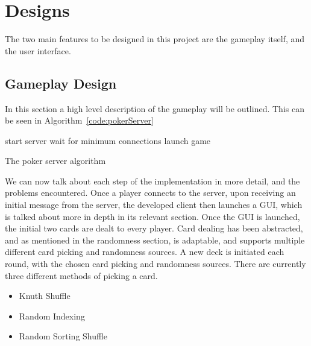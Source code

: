 \section{Designs}
The two main features to be designed in this project are the gameplay itself,
and the user interface.

\subsection{Gameplay Design}
In this section a high level description of the gameplay will be outlined.
This can be seen in Algorithm~\ref{code:pokerServer}

\vspace{0.3cm}

\begin{algorithm}[H]
     start server\;
     wait for minimum connections\;
     launch game\;
\caption{The poker server algorithm}%
\label{code:pokerServer}
\end{algorithm}

\vspace{0.3cm}

We can now talk about each step of the implementation in more detail, and the
problems encountered. Once a player connects to the server, upon receiving
an initial message from the server, the developed client then launches
a GUI, which is talked about more in depth in its relevant section. Once the
GUI is launched, the initial two cards are dealt to every player. Card dealing 
has been abstracted, and as mentioned in the randomness section, is adaptable, 
and supports multiple different card picking and randomness sources. A new deck
is initiated each round, with the chosen card picking and randomness sources. 
There are currently three different methods of picking a card.

\begin{itemize}
    \item Knuth Shuffle
    \item Random Indexing
    \item Random Sorting Shuffle
\end{itemize}

